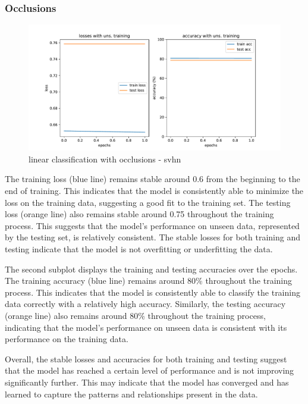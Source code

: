\documentclass{midl} %
\begin{document}
\subsubsection{Occlusions}
\begin{figure}[H]
  \centering
  \includegraphics[width=1.2\textwidth]{linear_classif_occ_svhn.pdf}
  \caption{linear classification with occlusions - svhn}
  \label{fig:linear classification with occlusions - svhn}
\end{figure}
The training loss (blue line) remains stable around 0.6 from the beginning to the end of training. This indicates that the model is consistently able to minimize the loss on the training data, suggesting a good fit to the training set. The testing loss (orange line) also remains stable around 0.75 throughout the training process. This suggests that the model's performance on unseen data, represented by the testing set, is relatively consistent. The stable losses for both training and testing indicate that the model is not overfitting or underfitting the data.

The second subplot displays the training and testing accuracies over the epochs. The training accuracy (blue line) remains around 80\% throughout the training process. This indicates that the model is consistently able to classify the training data correctly with a relatively high accuracy. Similarly, the testing accuracy (orange line) also remains around 80\% throughout the training process, indicating that the model's performance on unseen data is consistent with its performance on the training data.

Overall, the stable losses and accuracies for both training and testing suggest that the model has reached a certain level of performance and is not improving significantly further. This may indicate that the model has converged and has learned to capture the patterns and relationships present in the data. 
\end{document}
